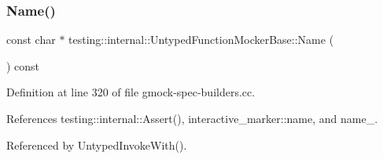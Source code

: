 \subsubsection{\texorpdfstring{Name()}{Name()}}
{\footnotesize\ttfamily const char $\ast$ testing\+::internal\+::\+Untyped\+Function\+Mocker\+Base\+::\+Name (\begin{DoxyParamCaption}{ }\end{DoxyParamCaption}) const}



Definition at line 320 of file gmock-\/spec-\/builders.\+cc.



References testing\+::internal\+::\+Assert(), interactive\+\_\+marker\+::name, and name\+\_\+.



Referenced by Untyped\+Invoke\+With().


